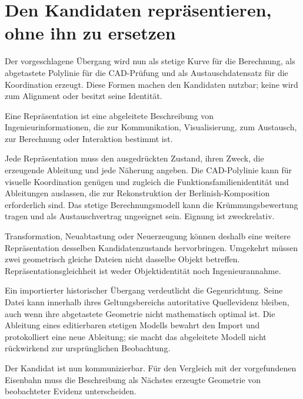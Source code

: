 
\chapter{Den Kandidaten repräsentieren, ohne ihn zu ersetzen}
\label{chap:representations}

Der vorgeschlagene Übergang wird nun als stetige Kurve für die Berechnung, als
abgetastete Polylinie für die CAD-Prüfung und als Austauschdatensatz für die
Koordination erzeugt. Diese Formen machen den Kandidaten nutzbar; keine wird
zum Alignment oder besitzt seine Identität.

\begin{definition}[Repräsentation]
\label{def:representation}
Eine Repräsentation ist eine abgeleitete Beschreibung von
Ingenieurinformationen, die zur Kommunikation, Visualisierung, zum Austausch,
zur Berechnung oder Interaktion bestimmt ist.
\end{definition}

Jede Repräsentation muss den ausgedrückten Zustand, ihren Zweck, die erzeugende
Ableitung und jede Näherung angeben. Die CAD-Polylinie kann für visuelle
Koordination genügen und zugleich die Funktionsfamilienidentität und
Ableitungen auslassen, die zur Rekonstruktion der Berlinish-Komposition
erforderlich sind. Das stetige Berechnungsmodell kann die Krümmungsbewertung
tragen und als Austauschvertrag ungeeignet sein. Eignung ist zweckrelativ.

Transformation, Neuabtastung oder Neuerzeugung können deshalb eine weitere
Repräsentation desselben Kandidatenzustands hervorbringen. Umgekehrt müssen
zwei geometrisch gleiche Dateien nicht dasselbe Objekt betreffen.
Repräsentationsgleichheit ist weder Objektidentität noch Ingenieurannahme.

Ein importierter historischer Übergang verdeutlicht die Gegenrichtung. Seine
Datei kann innerhalb ihres Geltungsbereichs autoritative Quellevidenz bleiben,
auch wenn ihre abgetastete Geometrie nicht mathematisch optimal ist. Die
Ableitung eines editierbaren stetigen Modells bewahrt den Import und
protokolliert eine neue Ableitung; sie macht das abgeleitete Modell nicht
rückwirkend zur ursprünglichen Beobachtung.

Der Kandidat ist nun kommunizierbar. Für den Vergleich mit der vorgefundenen
Eisenbahn muss die Beschreibung als Nächstes erzeugte Geometrie von
beobachteter Evidenz unterscheiden.
